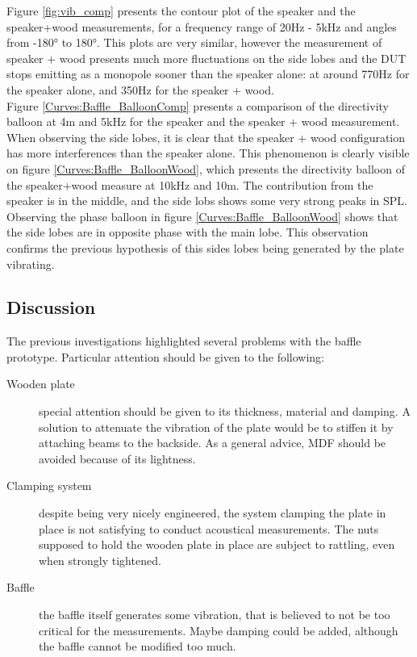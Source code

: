 \documentclass{report}
\begin{document}
Figure \ref{fig:vib_comp} presents the contour plot of the speaker and the speaker+wood measurements, for a frequency range of 20Hz - 5kHz and angles from -180° to 180°. This plots are very similar, however the measurement of speaker + wood presents much more fluctuations on the side lobes and the DUT stops emitting as a monopole sooner than the speaker alone: at around 770Hz for the speaker alone, and 350Hz for the speaker + wood.\\

Figure \ref{Curves:Baffle_BalloonComp} presents a comparison of the directivity balloon at 4m and 5kHz for the speaker and the speaker + wood measurement. When observing the side lobes, it is clear that the speaker + wood configuration has more interferences than the speaker alone. This phenomenon is clearly visible on figure \ref{Curves:Baffle_BalloonWood}, which presents the directivity balloon of the speaker+wood measure at 10kHz and 10m. The contribution from the speaker is in the middle, and the side lobs shows some very strong peaks in SPL. \\
Observing the phase balloon in figure \ref{Curves:Baffle_BalloonWood} shows that the side lobes are in opposite phase with the main lobe. This observation confirms the previous hypothesis of this sides lobes being generated by the plate vibrating. 

\subsection{Discussion}

The previous investigations highlighted several problems with the baffle prototype. Particular attention should be given to the following:
\begin{description}
\item[Wooden plate] special attention should be given to its thickness, material and damping. A solution to attenuate the vibration of the plate would be to stiffen it by attaching beams to the backside. As a general advice, MDF should be avoided because of its lightness. 
\item[Clamping system] despite being very nicely engineered, the system clamping the plate in place is not satisfying to conduct acoustical measurements. The nuts supposed to hold the wooden plate in place are subject to rattling, even when strongly tightened.
\item[Baffle] the baffle itself generates some vibration, that is believed to not be too critical for the measurements. Maybe damping could be added, although the baffle cannot be modified too much. 
\end{description}
\end{document}
